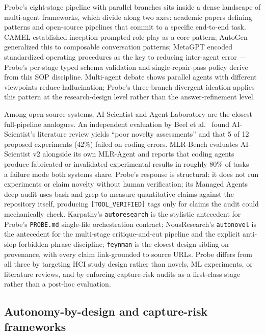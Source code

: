 Probe's eight-stage pipeline with parallel branches sits inside a dense landscape of multi-agent frameworks, which divide along two axes: academic papers defining patterns and open-source pipelines that commit to a specific end-to-end task. CAMEL \citep{li2023camel} established inception-prompted role-play as a core pattern; AutoGen \citep{wu2024autogen} generalized this to composable conversation patterns; MetaGPT \citep{hong2024metagpt} encoded standardized operating procedures as the key to reducing inter-agent error --- Probe's per-stage typed schema validation and single-repair-pass policy derive from this SOP discipline. Multi-agent debate \citep{du2024debate} shows parallel agents with different viewpoints reduce hallucination; Probe's three-branch divergent ideation applies this pattern at the research-design level rather than the answer-refinement level.

Among open-source systems, AI-Scientist \citep{lu2024aiscientist} and Agent Laboratory \citep{schmidgall2025agentlab} are the closest full-pipeline analogues. An independent evaluation by Beel et al.\ \citep{beel2025aiscientistevaluation} found AI-Scientist's literature review yields ``poor novelty assessments'' and that 5 of 12 proposed experiments (42\%) failed on coding errors. MLR-Bench \citep{chen2025mlrbench} evaluates AI-Scientist v2 alongside its own MLR-Agent and reports that coding agents produce fabricated or invalidated experimental results in roughly 80\% of tasks --- a failure mode both systems share. Probe's response is structural: it does not run experiments or claim novelty without human verification; its Managed Agents deep audit uses bash and grep to measure quantitative claims against the repository itself, producing \texttt{[TOOL\_VERIFIED]} tags only for claims the audit could mechanically check. Karpathy's \texttt{autoresearch} \citep{karpathy2025autoresearch} is the stylistic antecedent for Probe's \texttt{PROBE.md} single-file orchestration contract; NousResearch's \texttt{autonovel} \citep{nousresearch2025autonovel} is the antecedent for the multi-stage critique-and-cut pipeline and the explicit anti-slop forbidden-phrase discipline; \texttt{feynman} \citep{companion2025feynman} is the closest design sibling on provenance, with every claim link-grounded to source URLs. Probe differs from all three by targeting HCI study design rather than novels, ML experiments, or literature reviews, and by enforcing capture-risk audits as a first-class stage rather than a post-hoc evaluation.

\subsection{Autonomy-by-design and capture-risk frameworks}

